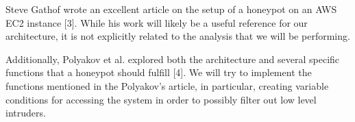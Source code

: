 Steve Gathof wrote an excellent article on the setup of a honeypot on an AWS EC2 instance [3]. While his work will likely be a useful reference for our architecture, it is not explicitly related to the analysis that we will be performing. 

Additionally, Polyakov et al. explored both the architecture and several specific functions that a honeypot should fulfill [4]. We will try to implement the functions mentioned in the Polyakov's article, in particular, creating variable conditions for accessing the system in order to possibly filter out low level intruders.